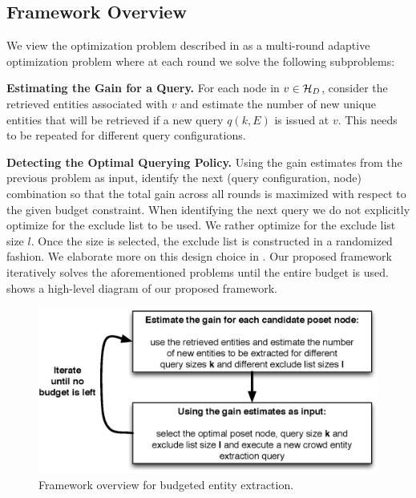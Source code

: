 \subsection{Framework Overview}
\label{sec:framework}
We view the optimization problem described in  as a multi-round adaptive optimization problem where at each round we solve the following subproblems: 
\squishlist 
\item \textbf{Estimating the Gain for a Query.} For each node in $v \in \mathcal{H}_D$, consider the retrieved entities associated with $v$ and estimate the number of new unique entities that will be retrieved if a new query $q(k,E)$ is issued at $v$. This needs to be repeated for different query configurations. 
\item \textbf{Detecting the Optimal Querying Policy.} Using the gain estimates from the previous problem as input, identify the next (query configuration, node) combination so that the total gain across all rounds is maximized with respect to the given budget constraint. When identifying the next query we do not explicitly optimize for the exclude list to be used. We rather optimize for the exclude list size $l$. Once the size is selected, the exclude list is constructed in a randomized fashion. We elaborate more on this design choice in .
\squishend
Our proposed framework iteratively solves the aforementioned problems until the entire budget is used. \iftr {} shows a high-level diagram of our proposed framework.

\begin{figure}
	\begin{center}
	\includegraphics[clip,scale=0.43]{figs/framework.eps}
	\vspace{-10pt}
	\caption{Framework overview for budgeted entity extraction.}
	\label{fig:framework}
	\end{center}
	\vspace{-20pt}
\end{figure}
\fi